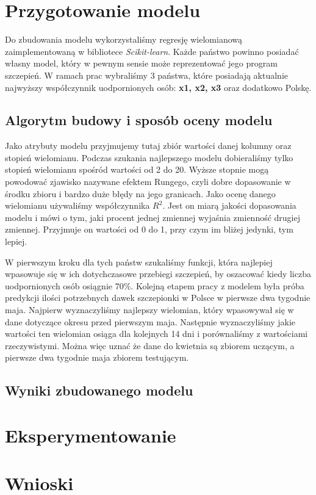 \documentclass[12pt, oneside]{article}
\begin{document}
\section{Przygotowanie modelu} 

Do zbudowania modelu wykorzystaliśmy regresję wielomianową zaimplementowaną w bibliotece \emph{Scikit-learn}. Każde państwo powinno posiadać własny model, który w pewnym sensie może reprezentować jego program szczepień. W ramach prac wybraliśmy 3 państwa, które posiadają aktualnie najwyższy współczynnik uodpornionych osób: \textbf{x1, x2, x3} oraz dodatkowo Polskę. 

\subsection{Algorytm budowy i sposób oceny modelu}

Jako atrybuty modelu przyjmujemy tutaj zbiór wartości danej kolumny oraz stopień wielomianu. Podczas szukania najlepszego modelu dobieraliśmy tylko stopień wielomianu spośród wartości od 2 do 20. Wyższe stopnie mogą powodować zjawisko nazywane efektem Rungego, czyli dobre dopasowanie w środku zbioru i bardzo duże błędy na jego granicach. Jako ocenę danego wielomianu używaliśmy współczynnika $R^{2}$. Jest on miarą jakości dopasowania modelu i mówi o tym, jaki procent jednej zmiennej wyjaśnia zmienność drugiej zmiennej. Przyjmuje on wartości od 0 do 1, przy czym im bliżej jedynki, tym lepiej.

W pierwszym kroku dla tych państw szukaliśmy funkcji, która najlepiej wpasowuje się w ich dotychczasowe przebiegi szczepień, by oszacować kiedy liczba uodpornionych osób osiągnie 70\%. Kolejną etapem pracy z modelem była próba predykcji ilości potrzebnych dawek szczepionki w Polsce w pierwsze dwa tygodnie maja. Najpierw wyznaczyliśmy najlepszy wielomian, który wpasowywał się w dane dotyczące okresu przed pierwszym maja. Następnie wyznaczyliśmy jakie wartości ten wielomian osiąga dla kolejnych 14 dni i porównaliśmy z wartościami rzeczywistymi. Można więc uznać że dane do kwietnia są zbiorem uczącym, a pierwsze dwa tygodnie maja zbiorem testującym.   

\subsection{Wyniki zbudowanego modelu}





\section{Eksperymentowanie}


\section{Wnioski}
\end{document}
